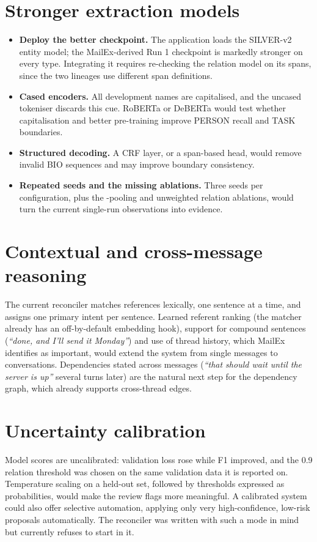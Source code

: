 \section{Stronger extraction models}
\begin{itemize}
  \item \textbf{Deploy the better checkpoint.} The application loads the SILVER-v2 entity model; the MailEx-derived Run 1 checkpoint is markedly stronger on every type. Integrating it requires re-checking the relation model on its spans, since the two lineages use different span definitions.
  \item \textbf{Cased encoders.} All development names are capitalised, and the uncased tokeniser discards this cue. RoBERTa \citep{liu2019roberta} or DeBERTa \citep{he2021deberta} would test whether capitalisation and better pre-training improve PERSON recall and TASK boundaries.
  \item \textbf{Structured decoding.} A CRF layer, or a span-based head, would remove invalid BIO sequences and may improve boundary consistency.
  \item \textbf{Repeated seeds and the missing ablations.} Three seeds per configuration, plus the \code{[CLS]}-pooling and unweighted relation ablations, would turn the current single-run observations into evidence.
\end{itemize}

\section{Contextual and cross-message reasoning}
The current reconciler matches references lexically, one sentence at a time, and assigns one primary intent per sentence. Learned referent ranking (the matcher already has an off-by-default embedding hook), support for compound sentences (\emph{``done, and I'll send it Monday''}) and use of thread history, which MailEx identifies as important, would extend the system from single messages to conversations. Dependencies stated across messages (\emph{``that should wait until the server is up''} several turns later) are the natural next step for the dependency graph, which already supports cross-thread edges.

\section{Uncertainty calibration}
Model scores are uncalibrated: validation loss rose while F1 improved, and the 0.9 relation threshold was chosen on the same validation data it is reported on. Temperature scaling \citep{guo2017calibration} on a held-out set, followed by thresholds expressed as probabilities, would make the review flags more meaningful. A calibrated system could also offer selective automation, applying only very high-confidence, low-risk proposals automatically. The reconciler was written with such a mode in mind but currently refuses to start in it.

